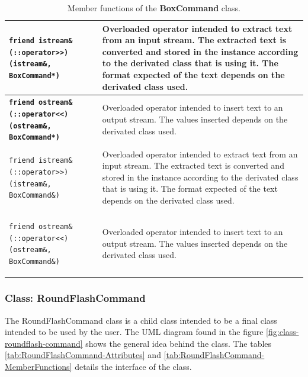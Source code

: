 \documentclass[11pt,twoside,openany,x11names,svgnames]{memoir}
\begin{document}
\begin{table}[h]
\begin{tabular}{| >{\bfseries}p{7.5cm} | p{8cm} |}
	\hline	
		
	\texttt{friend istream\& (::operator>>) (istream\&, BoxCommand*)} & Overloaded operator intended to extract text from an input stream. The extracted text is converted and stored in the instance according to the derivated class that is using it. The format expected of the text depends on the derivated class used. \\
	
	\hline
	
	\texttt{friend ostream\& (::operator<<) (ostream\&, BoxCommand*)} & Overloaded operator intended to insert text to an output stream. The values inserted depends on the derivated class used. \\
	
	\hline
	
	\texttt{friend istream\& (::operator>>) (istream\&, BoxCommand\&)} & Overloaded operator intended to extract text from an input stream. The extracted text is converted and stored in the instance according to the derivated class that is using it. The format expected of the text depends on the derivated class used. \\
	
	\hline
	
	\texttt{friend ostream\& (::operator<<) (ostream\&, BoxCommand\&)} & Overloaded operator intended to insert text to an output stream. The values inserted depends on the derivated class used. \\
	
	\hline
\end{tabular}
\caption{Member functions of the \textbf{BoxCommand} class.}
\label{tab:BoxCommand-MemberFunctions}
\end{table}

\clearpage

\subsubsection{Class: RoundFlashCommand}\label{Class-RoundFlashCommand}

The RoundFlashCommand class is a child class intended to be a final class intended to be used by the user. The UML diagram found in the figure \ref{fig:class-roundflash-command} shows the general idea behind the class. The tables \ref{tab:RoundFlashCommand-Attributes} and \ref{tab:RoundFlashCommand-MemberFunctions} details the interface of the class.
\end{document}

